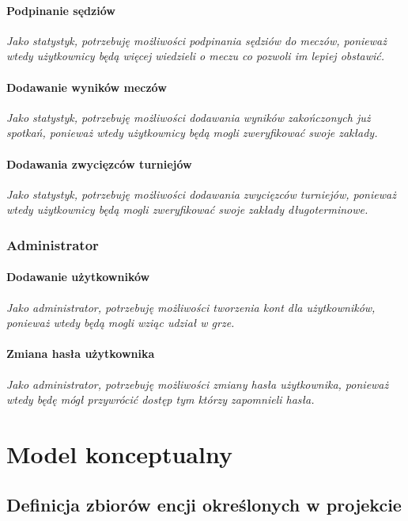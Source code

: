 \documentclass{mwrep}[15pt]
\begin{document}
\subsubsection{Podpinanie sędziów}
\emph{Jako statystyk, potrzebuję możliwości podpinania sędziów do meczów, ponieważ wtedy użytkownicy będą więcej wiedzieli o meczu co pozwoli im lepiej obstawić.}

\subsubsection{Dodawanie wyników meczów}
\emph{Jako statystyk, potrzebuję możliwości dodawania wyników zakończonych już spotkań, ponieważ wtedy użytkownicy będą mogli zweryfikować swoje zakłady.}

\subsubsection{Dodawania zwycięzców turniejów}
\emph{Jako statystyk, potrzebuję możliwości dodawania zwycięzców turniejów, ponieważ wtedy użytkownicy będą mogli zweryfikować swoje zakłady długoterminowe.}


\subsection{Administrator}
\subsubsection{Dodawanie użytkowników}
\emph{Jako administrator, potrzebuję możliwości tworzenia kont dla użytkowników, ponieważ wtedy będą mogli wziąc udział w grze.}

\subsubsection{Zmiana hasła użytkownika}
\emph{Jako administrator, potrzebuję możliwości zmiany hasła użytkownika, ponieważ wtedy będę mógł przywrócić dostęp tym którzy zapomnieli hasła.}












\chapter{Model konceptualny}

\section{Definicja zbiorów encji określonych w projekcie}
\end{document}
